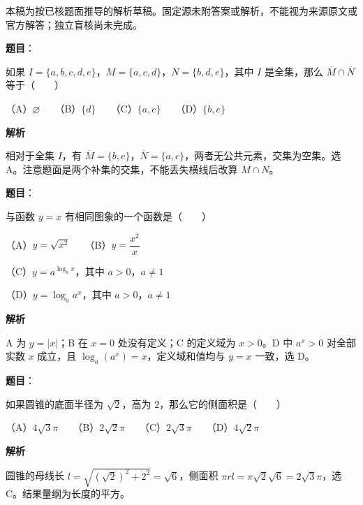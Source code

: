 

\begin{gktip}
本稿为按已核题面推导的解析草稿。固定源未附答案或解析，不能视为来源原文或官方解答；独立盲核尚未完成。
\end{gktip}

\begin{answer}

\textbf{题目}：

如果 $I=\{a,b,c,d,e\}$，$M=\{a,c,d\}$，$N=\{b,d,e\}$，其中 $I$ 是全集，那么 $\overline M\cap\overline N$ 等于\mbox{（　　）}

（A）$\varnothing$　　（B）$\{d\}$　　（C）$\{a,c\}$　　（D）$\{b,e\}$

\textbf{解析}

相对于全集 $I$，有 $\overline M=\{b,e\}$，$\overline N=\{a,c\}$，两者无公共元素，交集为空集。选 A。注意题面是两个补集的交集，不能丢失横线后改算 $M\cap N$。


\end{answer}
\begin{answer}

\textbf{题目}：

与函数 $y=x$ 有相同图象的一个函数是\mbox{（　　）}

（A）$y=\sqrt{x^2}$　　（B）$y=\dfrac{x^2}{x}$

（C）$y=a^{\log_a x}$，其中 $a>0$，$a\ne1$

（D）$y=\log_a a^x$，其中 $a>0$，$a\ne1$

\textbf{解析}

A 为 $y=|x|$；B 在 $x=0$ 处没有定义；C 的定义域为 $x>0$。D 中 $a^x>0$ 对全部实数 $x$ 成立，且 $\log_a(a^x)=x$，定义域和值均与 $y=x$ 一致，选 D。


\end{answer}
\begin{answer}

\textbf{题目}：

如果圆锥的底面半径为 $\sqrt2$，高为 $2$，那么它的侧面积是\mbox{（　　）}

（A）$4\sqrt3\pi$　　（B）$2\sqrt2\pi$　　（C）$2\sqrt3\pi$　　（D）$4\sqrt2\pi$

\textbf{解析}

圆锥的母线长 $l=\sqrt{(\sqrt2)^2+2^2}=\sqrt6$，侧面积 $\pi rl=\pi\sqrt2\sqrt6=2\sqrt3\pi$，选 C。结果量纲为长度的平方。


\end{answer}
